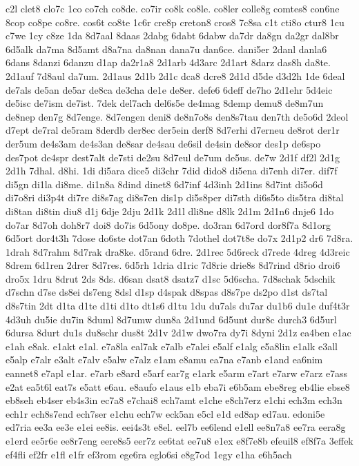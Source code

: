 {c2l
clet8
clo7c
1co
co7ch
co8de.
co7ir
co8k
co8le.
co8ler
colle8g
comtes8
con6ne
8cop
co8pe
co8re.
cos6t
co8te
1c6r
cre8p
creton8
cros8
7c8sa
c1t
cti8o
ctur8
1cu
c7we
1cy
c8ze
1da
8d7aal
8daas
2dabg
6dabt
6dabw
da7dr
da8gn
da2gr
dal8br
6d5alk
da7ma
8d5amt
d8a7na
da8nan
dana7u
dan6ce.
dani5er
2danl
danla6
6dans
8danzi
6danzu
d1ap
da2r1a8
2d1arb
4d3arc
2d1art
8darz
das8h
da8te.
2d1auf
7d8aul
da7um.
2d1aus
2d1b
2d1c
dca8
dcre8
2d1d
d5de
d3d2h
1de
6deal
de7als
de5an
de5ar
de8ca
de3cha
de1e
de8er.
defe6
6deff
de7ho
2d1ehr
5d4eic
de5isc
de7ism
de7ist.
7dek
del7ach
del6s5e
de4mag
8demp
demu8
de8m7un
de8nep
den7g
8d7enge.
8d7engen
deni8
de8n7o8s
den8s7tau
den7th
de5o6d
2deol
d7ept
de7ral
de5ram
8derdb
der8ec
der5ein
derf8
8d7erhi
d7erneu
de8rot
der1r
der5um
de4s3am
de4s3an
de8sar
de4sau
de6sil
de4sin
de8sor
des1p
de6spo
des7pot
de4spr
dest7alt
de7sti
de2su
8d7eul
de7um
de5us.
de7w
2d1f
df2l
2d1g
2d1h
7dhal.
d8hi.
1di
di5ara
dice5
di3chr
7did
dido8
di5ena
di7enh
di7er.
dif7f
di5gn
di1la
di8me.
di1n8a
8dind
dinet8
6d7inf
4d3inh
2d1ins
8d7int
di5o6d
di7o8ri
di3p4t
di7re
di8s7ag
di8s7en
dis1p
di5s8per
di7sth
di6s5to
dis5tra
di8tal
di8tan
di8tin
diu8
d1j
6dje
2dju
2d1k
2d1l
dli8ne
d8lk
2d1m
2d1n6
dnje6
1do
do7ar
8d7oh
doh8r7
doi8
do7is
6d5ony
do8pe.
do3ran
6d7ord
dor8f7a
8d1org
6d5ort
dor4t3h
7dose
do6ste
dot7an
6doth
7dothel
dot7t8e
do7x
2d1p2
dr6
7d8ra.
1drah
8d7rahm
8d7rak
dra8ke.
d5rand
6dre.
2d1rec
5d6reck
d7rede
4dreg
4d3reic
8drem
6d1ren
2drer
8d7res.
6d5rh
1dria
d1ric
7d8rie
drie8s
8d7rind
d8rio
droi6
dro5x
1dru
8drut
2ds
8ds.
d6san
dsat8
dsatz7
d1sc
5d6scha.
7d8schak
5dschik
d7schn
d7se
ds8ei
ds7eng
8dsl
d1sp
d4spak
d8spas
d8s7pe
ds2po
d1st
ds7tal
d8s7tin
2dt
d1ta
d1te
d1ti
d1to
dt1s6
d1tu
1du
du7als
du7ar
du1b6
du1e
duf4t3r
4d3uh
du5ie
du7in
8duml
8d7umw
dun8a
2d1und
6d5unt
dur8c
durch3
6d5url
6dursa
8durt
du1s
du8schr
dus8t
2d1v
2d1w
dwo7ra
dy7i
8dyni
2d1z
ea4ben
e1ac
e1ah
e8ak.
e1akt
e1al.
e7a8la
eal7ak
e7alb
e7alei
e5alf
e1alg
e5a8lin
e1alk
e3all
e5alp
e7alr
e3alt
e7alv
e5alw
e7alz
e1am
e8amu
ea7na
e7anb
e1and
ea6nim
eannet8
e7apl
e1ar.
e7arb
e8ard
e5arf
ear7g
e1ark
e5arm
e7art
e7arw
e7arz
e7ass
e2at
ea5t6l
eat7s
e5att
e6au.
e8aufo
e1aus
e1b
eba7i
e6b5am
ebe8reg
eb4lie
ebse8
eb8seh
eb4ser
eb4s3in
ec7a8
e7chai8
ech7amt
e1che
e8ch7erz
e1chi
ech3m
ech3n
ech1r
ech8s7end
ech7ser
e1chu
ech7w
eck5an
e5cl
e1d
ed8ap
ed7au.
edoni5e
ed7ria
ee3a
ee3e
e1ei
ee8is.
eei4s3t
e8el.
eel7b
ee6lend
e1ell
ee8n7a8
ee7ra
eera8g
e1erd
ee5r6e
ee8r7eng
eere8s5
eer7z
ee6tat
ee7u8
e1ex
e8f7e8b
efeuil8
ef8f7a
3effek
ef4fli
ef2fr
e1fl
e1fr
ef3rom
ege6ra
eglo6si
e8g7od
1egy
e1ha
e6h5ach
}
